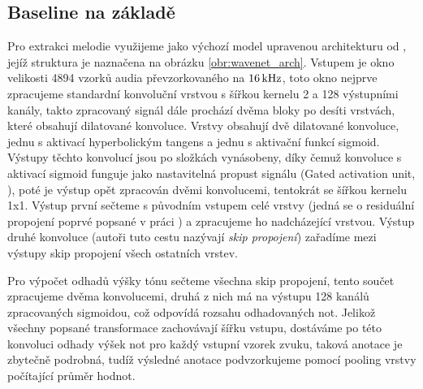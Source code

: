\subsection{Baseline na základě \cite{Martak2018}}



Pro extrakci melodie využijeme jako výchozí model upravenou architekturu od \cite{Martak2018}, jejíž struktura je naznačena na obrázku \ref{obr:wavenet_arch}. Vstupem je okno velikosti 4894 vzorků audia převzorkovaného na $16\,\rm kHz$, toto okno nejprve zpracujeme standardní konvoluční vrstvou s šířkou kernelu 2 a 128 výstupními kanály, takto zpracovaný signál dále prochází dvěma bloky po desíti vrstvách, které obsahují dilatované konvoluce. Vrstvy obsahují dvě dilatované konvoluce, jednu s aktivací hyperbolickým tangens a jednu s aktivační funkcí sigmoid. Výstupy těchto konvolucí jsou po složkách vynásobeny, díky čemuž konvoluce s aktivací sigmoid funguje jako nastavitelná propust signálu (Gated activation unit, \cite{Oord2016a}), poté je výstup opět zpracován dvěmi konvolucemi, tentokrát se šířkou kernelu 1x1. Výstup první sečteme s původním vstupem celé vrstvy (jedná se o residuální propojení poprvé popsané v práci \cite{He2015}) a zpracujeme ho nadcházející vrstvou. Výstup druhé konvoluce (autoři tuto cestu nazývají \emph{skip propojení}) zařadíme mezi výstupy skip propojení všech ostatních vrstev.

Pro výpočet odhadů výšky tónu sečteme všechna skip propojení, tento součet zpracujeme dvěma konvolucemi, druhá z nich má na výstupu 128 kanálů zpracovaných sigmoidou, což odpovídá rozsahu odhadovaných not. Jelikož všechny popsané transformace zachovávají šířku vstupu, dostáváme po této konvoluci odhady výšek not pro každý vstupní vzorek zvuku, taková anotace je zbytečně podrobná, tudíž výsledné anotace podvzorkujeme pomocí pooling vrstvy počítající průměr hodnot.



